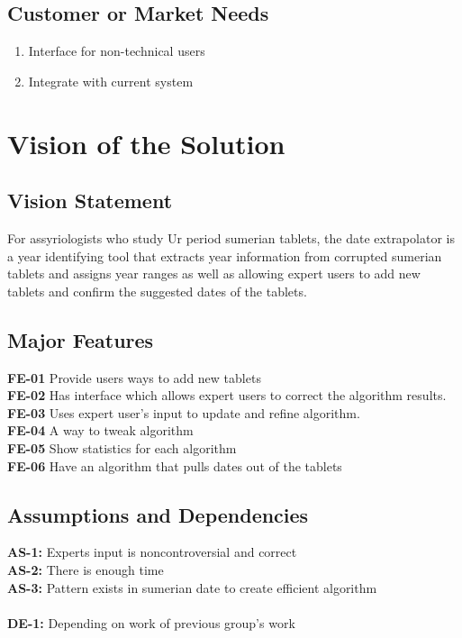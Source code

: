 \documentclass[11pt]{article}
\begin{document}
\subsection{Customer or Market Needs}
\begin{enumerate}
    \item Interface for non-technical users
    \item Integrate with current system 
\end{enumerate}

\section{Vision of the Solution}
\subsection{Vision Statement}
For assyriologists who study Ur period sumerian tablets, the date extrapolator is a year identifying tool that extracts year information from corrupted sumerian tablets and assigns year ranges as well as allowing expert users to add new tablets and confirm the suggested dates of the tablets.
\subsection{Major Features}
\textbf{FE-01} Provide users ways to add new tablets\\
\textbf{FE-02} Has interface which allows expert users to correct the algorithm results.\\
\textbf{FE-03} Uses expert user’s input to update and refine algorithm.\\
\textbf{FE-04} A way to tweak algorithm \\
\textbf{FE-05} Show statistics for each algorithm\\
\textbf{FE-06} Have an algorithm that pulls dates out of the tablets
\subsection{Assumptions and Dependencies}
\textbf{AS-1:} Experts input is noncontroversial and correct \\
\textbf{AS-2:} There is enough time \\
\textbf{AS-3:} Pattern exists in sumerian date to create efficient algorithm \\
 \\
 \textbf{DE-1:} Depending on work of previous group’s work \\
\end{document}
